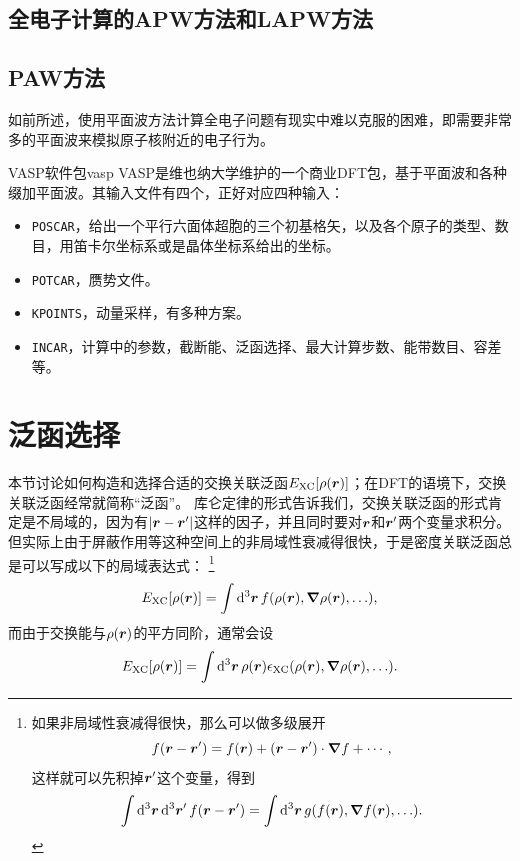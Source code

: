 \subsection{全电子计算的APW方法和LAPW方法}\label{sec:dft-lapw}


\subsection{PAW方法}\label{sec:dft-paw}

如前所述，使用平面波方法计算全电子问题有现实中难以克服的困难，即需要非常多的平面波来模拟原子核附近的电子行为。


\begin{info}{VASP软件包}{vasp}
    VASP是维也纳大学维护的一个商业DFT包，基于平面波和各种缀加平面波。其输入文件有四个，正好对应四种输入：
    \begin{itemize}
        \item \texttt{POSCAR}，给出一个平行六面体超胞的三个初基格矢，以及各个原子的类型、数目，用笛卡尔坐标系或是晶体坐标系给出的坐标。
        \item \texttt{POTCAR}，赝势文件。
        \item \texttt{KPOINTS}，动量采样，有多种方案。
        \item \texttt{INCAR}，计算中的参数，截断能、泛函选择、最大计算步数、能带数目、容差等。
    \end{itemize}
\end{info}

\section{泛函选择}

本节讨论如何构造和选择合适的交换关联泛函$E_\text{XC}[\rho(\vb*{r})]$；在DFT的语境下，交换关联泛函经常就简称“泛函”。
库仑定律的形式告诉我们，交换关联泛函的形式肯定是不局域的，因为有$\abs{\vb*{r} - \vb*{r}'}$这样的因子，并且同时要对$\vb*{r}$和$\vb*{r}'$两个变量求积分。
但实际上由于屏蔽作用等这种空间上的非局域性衰减得很快，于是密度关联泛函总是可以写成以下的局域表达式：%
\footnote{
    如果非局域性衰减得很快，那么可以做多级展开
    \[
        f(\vb*{r} - \vb*{r}') = f(\vb*{r}) + (\vb*{r} - \vb*{r}') \cdot \grad{f} + \cdots,
    \]
    这样就可以先积掉$\vb*{r}'$这个变量，得到
    \[
        \int \dd[3]{\vb*{r}} \dd[3]{\vb*{r}'} f(\vb*{r} - \vb*{r}') = \int \dd[3]{\vb*{r}} g(f(\vb*{r}), \grad{f(\vb*{r})}, \ldots).
    \]
}%
\[
    E_\text{XC}[\rho(\vb*{r})] = \int \dd[3]{\vb*{r}} f(\rho(\vb*{r}), \grad{\rho(\vb*{r})}, \ldots),
\]
而由于交换能与$\rho(\vb*{r})$的平方同阶，通常会设
\begin{equation}
    E_\text{XC}[\rho(\vb*{r})] = \int \dd[3]{\vb*{r}} \rho(\vb*{r}) \epsilon_\text{XC}(\rho(\vb*{r}), \grad{\rho(\vb*{r})}, \ldots).
\end{equation}


